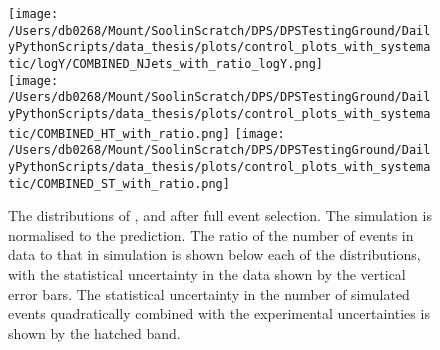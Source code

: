 \begin{figure}[hp]
	\centering
	\texttt{[image: /Users/db0268/Mount/SoolinScratch/DPS/DPSTestingGround/DailyPythonScripts/data\_thesis/plots/control\_plots\_with\_systematic/logY/COMBINED\_NJets\_with\_ratio\_logY.png]} \\
	\texttt{[image: /Users/db0268/Mount/SoolinScratch/DPS/DPSTestingGround/DailyPythonScripts/data\_thesis/plots/control\_plots\_with\_systematic/COMBINED\_HT\_with\_ratio.png]}
	\texttt{[image: /Users/db0268/Mount/SoolinScratch/DPS/DPSTestingGround/DailyPythonScripts/data\_thesis/plots/control\_plots\_with\_systematic/COMBINED\_ST\_with\_ratio.png]} \\
	\caption[The distributions of \NJET{}, \HT{} and \ST{} after full event selection. The \ttbar{} simulation is normalised to the \NNLO{} prediction. The ratio of the number of events in data to that in simulation is shown below each of the distributions, with the statistical uncertainty in the data shown by the vertical error bars. The statistical uncertainty in the number of simulated events quadratically combined with the experimental uncertainties is shown by the hatched band.]{The distributions of \NJET{}, \HT{} and \ST{} after full event selection. The \ttbar{} simulation is normalised to the \NNLO{} prediction. The ratio of the number of events in data to that in simulation is shown below each of the distributions, with the statistical uncertainty in the data shown by the vertical error bars. The statistical uncertainty in the number of simulated events quadratically combined with the experimental uncertainties is shown by the hatched band.}
	\label{fig:combControlPlot1}
\end{figure}
